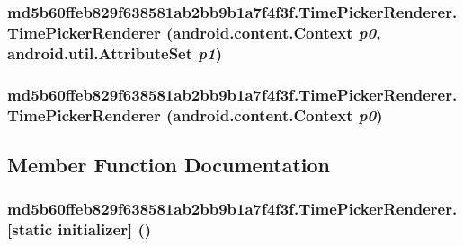 \hypertarget{classmd5b60ffeb829f638581ab2bb9b1a7f4f3f_1_1_time_picker_renderer_66248b9a92ae22c9d0929971dabb0092}{
\subsubsection[{TimePickerRenderer}]{\setlength{\rightskip}{0pt plus 5cm}md5b60ffeb829f638581ab2bb9b1a7f4f3f.TimePickerRenderer.TimePickerRenderer (android.content.Context {\em p0}, \/  android.util.AttributeSet {\em p1})}}
\label{classmd5b60ffeb829f638581ab2bb9b1a7f4f3f_1_1_time_picker_renderer_66248b9a92ae22c9d0929971dabb0092}


\hypertarget{classmd5b60ffeb829f638581ab2bb9b1a7f4f3f_1_1_time_picker_renderer_88438e043108dffa9cb1d613995b7aa1}{
\subsubsection[{TimePickerRenderer}]{\setlength{\rightskip}{0pt plus 5cm}md5b60ffeb829f638581ab2bb9b1a7f4f3f.TimePickerRenderer.TimePickerRenderer (android.content.Context {\em p0})}}
\label{classmd5b60ffeb829f638581ab2bb9b1a7f4f3f_1_1_time_picker_renderer_88438e043108dffa9cb1d613995b7aa1}




\subsection{Member Function Documentation}
\hypertarget{classmd5b60ffeb829f638581ab2bb9b1a7f4f3f_1_1_time_picker_renderer_a537d43fd640e0635d2def19652ab0be}{
\subsubsection[{[static initializer]}]{\setlength{\rightskip}{0pt plus 5cm}md5b60ffeb829f638581ab2bb9b1a7f4f3f.TimePickerRenderer.\mbox{[}static initializer\mbox{]} ()}}
\label{classmd5b60ffeb829f638581ab2bb9b1a7f4f3f_1_1_time_picker_renderer_a537d43fd640e0635d2def19652ab0be}




